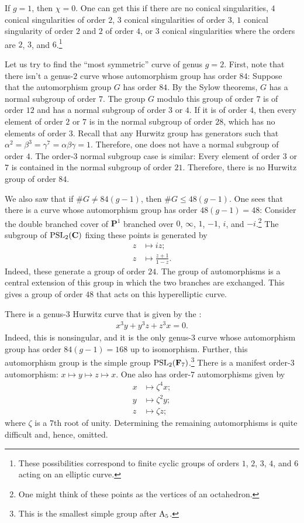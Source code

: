 \documentclass[11pt, oneside,margin=1in]{article}
\begin{document}
If $g=1$, then $\chi=0$. One can get this if there are no conical singularities, $4$ conical singularities of order $2$, $3$ conical singularities of order $3$, $1$ conical singularity of order $2$ and $2$ of order $4$, or $3$ conical singularities where the orders are $2$, $3$, and $6$.\footnote{These possibilities correspond to finite cyclic groups of orders $1$, $2$, $3$, $4$, and $6$ acting on an elliptic curve.} 

		Let us try to find the ``most symmetric'' curve of genus $g=2$. First, note that there isn't a genus-$2$ curve whose automorphism group has order $84$: Suppose that the automorphism group $G$ has order $84$. By the Sylow theorems, $G$ has a normal subgroup of order $7$. The group $G$ modulo this group of order $7$ is of order $12$ and has a normal subgroup of order $3$ or $4$. If it is of order $4$, then every element of order $2$ or $7$ is in the normal subgroup of order $28$, which has no elements of order $3$. Recall that any Hurwitz group has generators such that $\alpha^2 = \beta^3 = \gamma^7 = \alpha\beta\gamma = 1$. Therefore, one does not have a normal subgroup of order $4$. The order-$3$ normal subgroup case is similar: Every element of order $3$ or $7$ is contained in the normal subgroup of order $21$. Therefore, there is no Hurwitz group of order $84$.

		We also saw that if $\# G\ne 84(g-1)$, then $\# G \le 48(g-1)$. One sees that there is a curve whose automorphism group has order $48(g-1)=48$: Consider the double branched cover of $\mathbf{P}^1$ branched over $0$, $\infty$, $1$, $-1$, $i$, and $-i$.\footnote{One might think of these points as the vertices of an octahedron.} The subgroup of $\operatorname{PSL}_2(\mathbf{C})$ fixing these points is generated by
		\begin{align*}
			z&\longmapsto iz;\\
			z&\longmapsto \frac{z+1}{1-z}.
		\end{align*}
		Indeed, these generate a group of order $24$. The group of automorphisms is a central extension of this group in which the two branches are exchanged. This gives a group of order $48$ that acts on this hyperelliptic curve.

		There is a genus-$3$ Hurwitz curve that is given by the :
		\begin{align*}
			x^3y + y^3z + z^3x=0.
		\end{align*}
		Indeed, this is nonsingular, and it is the only genus-$3$ curve whose automorphism group has order $84(g-1)=168$ up to isomorphism. Further, this automorphism group is the simple group $\operatorname{PSL}_{2}(\mathbf{F}_{7})$.\footnote{This is the smallest simple group after $\operatorname{A}_5$.} There is a manifest order-$3$ automorphism: $x\longmapsto y\longmapsto z\longmapsto x$. One also has order-$7$ automorphisms given by
		\begin{align*}
			x&\longmapsto \zeta^4x;\\
			y&\longmapsto \zeta^2y;\\
			z&\longmapsto \zeta z;
		\end{align*}
		where $\zeta$ is a $7$th root of unity. Determining the remaining automorphisms is quite difficult and, hence, omitted.
\end{document}
